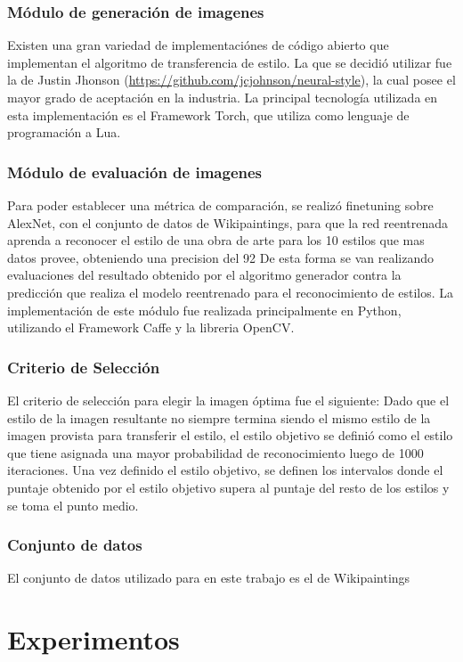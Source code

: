 \documentclass[a4paper,11pt,spanish]{book}
\begin{document}
    \subsection{Módulo de generación de imagenes}
      Existen una gran variedad de implementaciónes de código abierto que implementan el algoritmo de transferencia de estilo. La que se decidió utilizar fue la de Justin Jhonson (\url{https://github.com/jcjohnson/neural-style}),
      la cual posee el mayor grado de aceptación en la industria.
      La principal tecnología utilizada en esta implementación es el Framework Torch, que utiliza como lenguaje de programación a Lua.
    \subsection{Módulo de evaluación de imagenes}
      Para poder establecer una métrica de comparación, se realizó finetuning sobre AlexNet, con el conjunto de datos de Wikipaintings, para que la red reentrenada aprenda a reconocer
      el estilo de una obra de arte para los 10 estilos que mas datos provee, obteniendo una precision del 92%
      De esta forma se van realizando evaluaciones del resultado obtenido por el algoritmo generador contra la predicción que realiza el modelo reentrenado para el reconocimiento de estilos.
      La implementación de este módulo fue realizada principalmente en Python, utilizando el Framework Caffe y la libreria OpenCV.
    \subsection{Criterio de Selección}
      El criterio de selección para elegir la imagen óptima fue el siguiente:
      Dado que el estilo de la imagen resultante no siempre termina siendo el mismo estilo de la imagen provista para transferir el estilo, el estilo objetivo se definió como el estilo
      que tiene asignada una mayor probabilidad de reconocimiento luego de 1000 iteraciones.
      Una vez definido el estilo objetivo, se definen los intervalos donde el puntaje obtenido por el estilo objetivo supera al puntaje del resto de los estilos y se toma el punto medio.

    \subsection{Conjunto de datos}
      El conjunto de datos utilizado para en este trabajo es el de Wikipaintings
    
      
\chapter{Experimentos}
\end{document}
